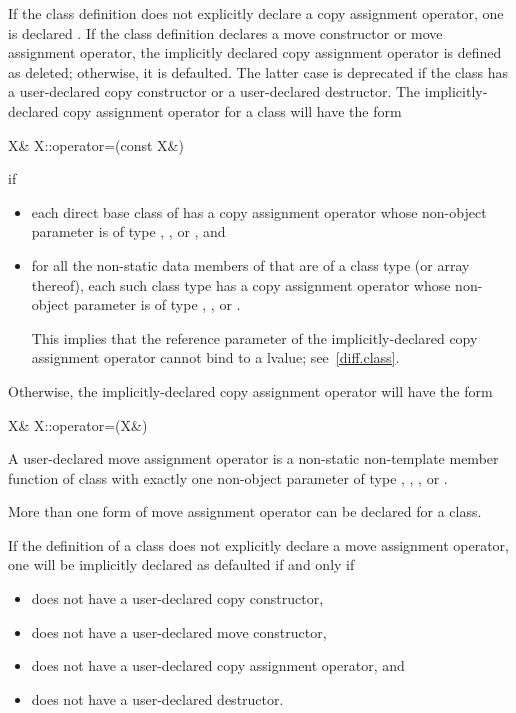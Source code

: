 \pnum
If the class definition does not explicitly declare a copy assignment operator,
one is declared .
If the class definition declares a move
constructor or move assignment operator, the implicitly declared copy
assignment operator is defined as deleted; otherwise, it is
defaulted.
The latter case is deprecated if the class has a user-declared copy constructor
or a user-declared destructor.
The implicitly-declared copy assignment operator for a class
will have the form
\begin{codeblock}
X& X::operator=(const X&)
\end{codeblock}
if
\begin{itemize}
\item
each direct base class  of 
has a copy assignment operator whose non-object parameter is of type
, , or , and
\item
for all the non-static data members of 
that are of a class type  (or array thereof),
each such class type has a copy assignment operator whose non-object parameter is of type
, ,
or .
\begin{footnote}
This implies that the reference parameter of the
implicitly-declared copy assignment operator cannot bind to a
 lvalue; see~\ref{diff.class}.
\end{footnote}
\end{itemize}

Otherwise, the implicitly-declared copy assignment operator
will have the form
\begin{codeblock}
X& X::operator=(X&)
\end{codeblock}

\pnum
A user-declared move assignment operator  is
a non-static non-template member function of class  with exactly
one non-object parameter of type , , , or
.
\begin{note}
More than one form of move assignment operator can be declared for a class.
\end{note}

\pnum
{}%
If the definition of a class  does not explicitly declare a
move assignment operator, one
will be implicitly declared as defaulted if and only if
\begin{itemize}
\item
{} does not have a user-declared copy constructor,

\item
{} does not have a user-declared move constructor,

\item
{} does not have a user-declared copy assignment operator, and

\item
{} does not have a user-declared destructor.
\end{itemize}

